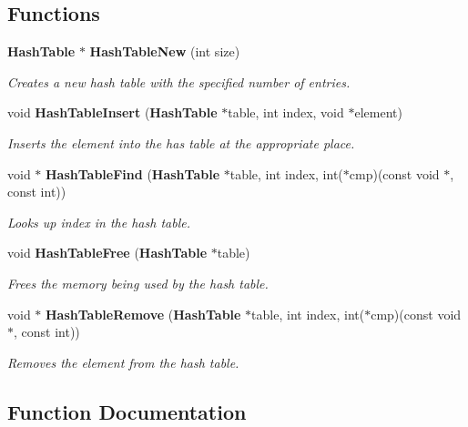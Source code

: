 \subsection*{Functions}
\begin{CompactItemize}
\item 
{\bf Hash\-Table} $\ast$ {\bf Hash\-Table\-New} (int size)
\begin{CompactList}\small\item\em Creates a new hash table with the specified number of entries. \item\end{CompactList}\item 
void {\bf Hash\-Table\-Insert} ({\bf Hash\-Table} $\ast$table, int index, void $\ast$element)
\begin{CompactList}\small\item\em Inserts the element into the has table at the appropriate place. \item\end{CompactList}\item 
void $\ast$ {\bf Hash\-Table\-Find} ({\bf Hash\-Table} $\ast$table, int index, int($\ast$cmp)(const void $\ast$, const int))
\begin{CompactList}\small\item\em Looks up index in the hash table. \item\end{CompactList}\item 
void {\bf Hash\-Table\-Free} ({\bf Hash\-Table} $\ast$table)
\begin{CompactList}\small\item\em Frees the memory being used by the hash table. \item\end{CompactList}\item 
void $\ast$ {\bf Hash\-Table\-Remove} ({\bf Hash\-Table} $\ast$table, int index, int($\ast$cmp)(const void $\ast$, const int))
\begin{CompactList}\small\item\em Removes the element from the hash table. \item\end{CompactList}\end{CompactItemize}


\subsection{Function Documentation}
